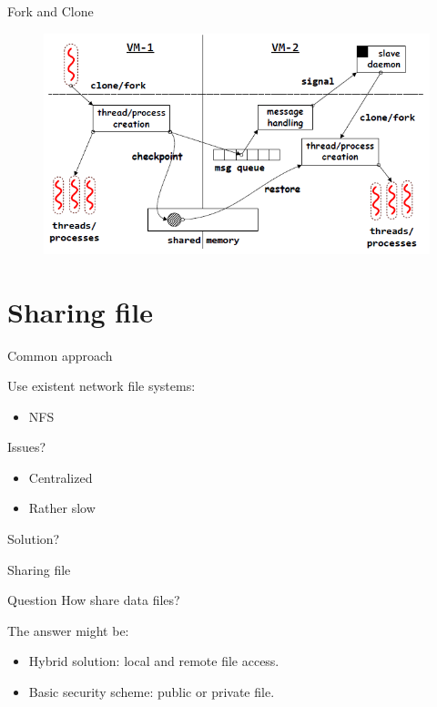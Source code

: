 \documentclass{beamer}
\begin{document}
	\begin{frame}{Fork and Clone}
	
		\begin{figure} [H]
			\centering
			\includegraphics[scale=0.40]{img/cerberus-fork-clone}
		\end{figure}	
	
	\end{frame}

\section{Sharing file}
	
	\begin{frame}{Common approach}	
	
		Use existent network file systems:
		\begin{itemize}
		\item NFS
		\end{itemize}
		
		Issues?
		\begin{itemize}
		\item Centralized
		\item Rather slow
		\end{itemize}		

		\begin{alertblock}{}
			Solution?
		\end{alertblock}

	\end{frame}	
	
	\begin{frame}{Sharing file}	
	
		\begin{block}{Question}
			How share data files?
		\end{block}
		
		The answer might be:		
		\begin{itemize}
		\item Hybrid solution: local and remote file access.
		\item Basic security scheme: public or private file.
		\end{itemize}

	\end{frame}
\end{document}
